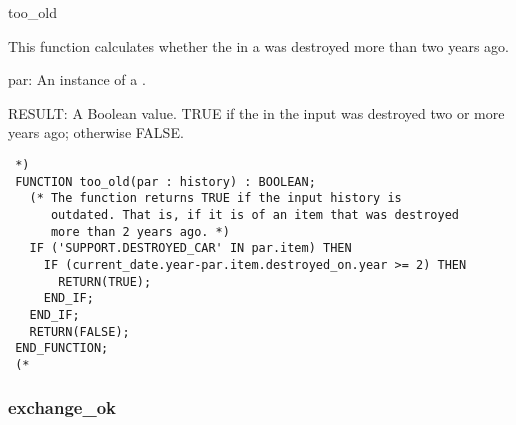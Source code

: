 \documentclass{article}
\begin{document}
 \begin{Mnamedesc}{too_old}

 \begin{Mdesctext}

 This function calculates whether the  in a  was
 destroyed more than two years ago.

 \end{Mdesctext}

 \begin{Ipars}

 \item[par:] An instance of a .

 \item[RESULT:] A Boolean value. TRUE if the  in the input
  was destroyed two or more years ago; otherwise FALSE.

 \end{Ipars}

 \begin{Mexp}
 \begin{verbatim}
 *)
 FUNCTION too_old(par : history) : BOOLEAN;
   (* The function returns TRUE if the input history is
      outdated. That is, if it is of an item that was destroyed
      more than 2 years ago. *)
   IF ('SUPPORT.DESTROYED_CAR' IN par.item) THEN
     IF (current_date.year-par.item.destroyed_on.year >= 2) THEN
       RETURN(TRUE);
     END_IF;
   END_IF;
   RETURN(FALSE);
 END_FUNCTION;
 (*
 \end{verbatim}
 \end{Mexp}
 \end{Mnamedesc}

 \subsubsection{exchange\_ok}
\end{document}
